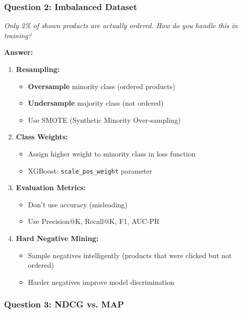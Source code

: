 \documentclass[11pt,letterpaper]{article}
\begin{document}
\subsubsection{Question 2: Imbalanced Dataset}

\textit{Only 2\% of shown products are actually ordered. How do you handle this in training?}

\textbf{Answer:}

\begin{enumerate}
    \item \textbf{Resampling:}
    \begin{itemize}
        \item \textbf{Oversample} minority class (ordered products)
        \item \textbf{Undersample} majority class (not ordered)
        \item Use SMOTE (Synthetic Minority Over-sampling)
    \end{itemize}

    \item \textbf{Class Weights:}
    \begin{itemize}
        \item Assign higher weight to minority class in loss function
        \item XGBoost: \texttt{scale\_pos\_weight} parameter
    \end{itemize}

    \item \textbf{Evaluation Metrics:}
    \begin{itemize}
        \item Don't use accuracy (misleading)
        \item Use Precision@K, Recall@K, F1, AUC-PR
    \end{itemize}

    \item \textbf{Hard Negative Mining:}
    \begin{itemize}
        \item Sample negatives intelligently (products that were clicked but not ordered)
        \item Harder negatives improve model discrimination
    \end{itemize}
\end{enumerate}

\subsubsection{Question 3: NDCG vs. MAP}
\end{document}
